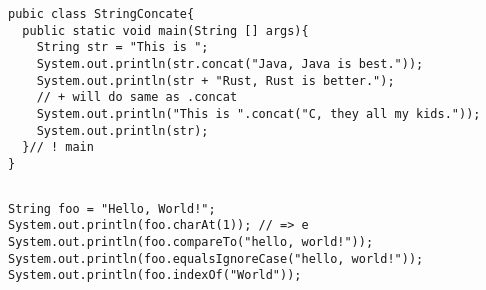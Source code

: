 \documentclass[en, 11pt, xcolor=dvipsnames]{beamer}
\begin{document}
\begin{frame}[fragile]
\begin{columns}[c]
\begin{column}{0.9\textwidth}
			\begin{lstlisting}[style=Java]
pubic class StringConcate{
  public static void main(String [] args){
    String str = "This is ";
    System.out.println(str.concat("Java, Java is best."));
    System.out.println(str + "Rust, Rust is better.");
    // + will do same as .concat
    System.out.println("This is ".concat("C, they all my kids."));
    System.out.println(str);
  }// ! main
}\end{lstlisting}


		\end{column}
	\end{columns}

\end{frame}

\begin{frame}[fragile]

	\begin{columns}
		\begin{column}{0.9\textwidth}

			\begin{lstlisting}[style=Java]
String foo = "Hello, World!";
System.out.println(foo.charAt(1)); // => e
System.out.println(foo.compareTo("hello, world!"));
System.out.println(foo.equalsIgnoreCase("hello, world!"));
System.out.println(foo.indexOf("World"));\end{lstlisting}

		\end{column}
	\end{columns}
\end{frame}
\end{document}

